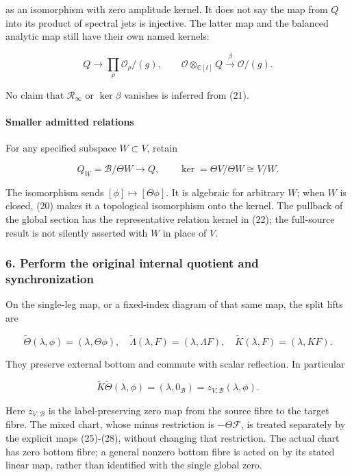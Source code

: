 as an isomorphism with zero amplitude kernel. It does not say the map from \(Q\) into its product of
spectral jets is injective. The latter map and the balanced analytic map still have their own named
kernels:

\[Q\to\prod_\rho\mathcal O_\rho/(g),\qquad
\mathcal O\otimes_{\mathbb C[t]}Q\xrightarrow{\beta}\mathcal O/(g).\]

No claim that \(\mathcal R_\infty\) or \(\ker\beta\) vanishes is inferred from (21).

\paragraph{Smaller admitted relations}\label{pr_10:smaller-admitted-relations}

For any specified subspace \(W\subset V\), retain

\[Q_W=\mathscr B/\Theta W\longrightarrow Q,\qquad
\ker=\Theta V/\Theta W\cong V/W.\tag{22}\]

The isomorphism sends \([\phi]\mapsto[\Theta\phi]\). It is algebraic for arbitrary \(W\); when \(W\)
is closed, (20) makes it a topological isomorphism onto the kernel. The pullback of the global
section has the representative relation kernel in (22); the full-source result is not silently
asserted with \(W\) in place of \(V\).

\subsubsection{6. Perform the original internal quotient and
synchronization}\label{pr_10:perform-the-original-internal-quotient-and-synchronization}

On the single-leg map, or a fixed-index diagram of that same map, the split lifts are

\[\widetilde\Theta(\lambda,\phi)=(\lambda,\Theta\phi),\quad
\widetilde\Lambda(\lambda,F)=(\lambda,\Lambda F),\quad
\widetilde K(\lambda,F)=(\lambda,KF).\tag{23}\]

They preserve external bottom and commute with scalar reflection. In particular

\[\widetilde K\widetilde\Theta(\lambda,\phi)=(\lambda,0_{\mathscr B})=z_{V,\mathscr B}(\lambda,\phi).\]

Here \(z_{V,\mathscr B}\) is the label-preserving zero map from the source fibre to the target
fibre. The mixed chart, whose minus restriction is \(-\Theta\mathcal F\), is treated separately by
the explicit maps (25)-(28), without changing that restriction. The actual chart has zero bottom
fibre; a general nonzero bottom fibre is acted on by its stated linear map, rather than identified
with the single global zero.

